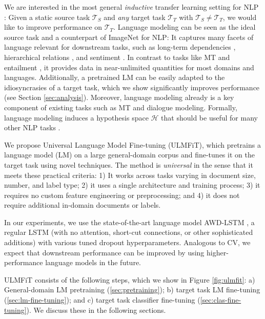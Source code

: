 \documentclass[11pt,a4paper]{article}
\begin{document}
We are interested in the most general \emph{inductive} transfer learning setting for NLP \cite{Pan2010}: Given a static source task $\mathcal{T}_S$ and \emph{any} target task $\mathcal{T}_T$ with $\mathcal{T}_S \neq \mathcal{T}_T$, we would like to improve performance on $\mathcal{T}_T$. Language modeling can be seen as the ideal source task and a counterpart of ImageNet for NLP: It captures many facets of language relevant for downstream tasks, such as long-term dependencies \cite{linzen2016assessing}, hierarchical relations \cite{Gulordava2018}, and sentiment \cite{radford2017learning}. In contrast to tasks like MT \cite{Mccann2017} and entailment \cite{Conneau2017}, it provides data in near-unlimited quantities for most domains and languages. Additionally, a pretrained LM can be easily adapted to the idiosyncrasies of a target task, which we show significantly improves performance (see Section \ref{sec:analysis}). Moreover, language modeling already is a key component of existing tasks such as MT and dialogue modeling. Formally, language modeling induces a hypothesis space $\mathcal{H}$ that should be useful for many other NLP tasks \cite{vapnik1982estimation,Baxter2000}. 

We propose Universal Language Model Fine-tuning (ULMFiT), which pretrains a language model (LM) on a large general-domain corpus and fine-tunes it on the target task using novel techniques. The method is \emph{universal} in the sense that it meets these practical criteria: 1) It works across tasks varying in document size, number, and label type; 2) it uses a single architecture and training process; 3) it requires no custom feature engineering or preprocessing; and 4) it does not require additional in-domain documents or labels.

In our experiments, we use the state-of-the-art language model AWD-LSTM \cite{Merity2017}, a regular LSTM (with no attention, short-cut connections, or other sophisticated additions) with various tuned dropout hyperparameters. Analogous to CV, we expect that downstream performance can be improved by using higher-performance language models in the future.

ULMFiT consists of the following steps, which we show in Figure \ref{fig:ulmfit}: a) General-domain LM pretraining (\textsection \ref{sec:pretraining}); b) target task LM fine-tuning (\textsection \ref{sec:lm-fine-tuning}); and c) target task classifier fine-tuning (\textsection \ref{sec:clas-fine-tuning}). We discuss these in the following sections.
\end{document}
